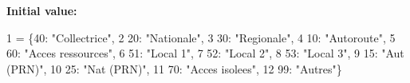 {\bfseries Initial value\-:}
\begin{DoxyCode}
1 = \{40: \textcolor{stringliteral}{"Collectrice"},
2                          20: \textcolor{stringliteral}{"Nationale"},
3                          30: \textcolor{stringliteral}{"Regionale"},
4                          10: \textcolor{stringliteral}{"Autoroute"},
5                          60: \textcolor{stringliteral}{"Acces ressources"},
6                          51: \textcolor{stringliteral}{"Local 1"},
7                          52: \textcolor{stringliteral}{"Local 2"},
8                          53: \textcolor{stringliteral}{"Local 3"},
9                          15: \textcolor{stringliteral}{"Aut (PRN)"},
10                          25: \textcolor{stringliteral}{"Nat (PRN)"},
11                          70: \textcolor{stringliteral}{"Acces isolees"},
12                          99: \textcolor{stringliteral}{"Autres"}\}
\end{DoxyCode}
